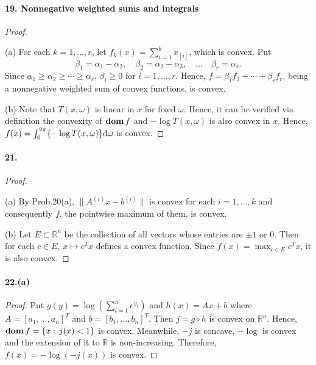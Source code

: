   \paragraph{19. Nonnegative weighted sums and integrals}
  \begin{proof}
    $\,$\par
    (a) For each $k=1,\dots,r$, let $f_k(x)=\sum_{i=1}^k x_[i]$, which is
    convex. Put
    \[
      \beta_1=\alpha_1-\alpha_2,\quad
      \beta_2=\alpha_2-\alpha_3,\quad
      \dots\quad
      \beta_r=\alpha_r.
    \]
    Since $\alpha_1\ge\alpha_2\ge\cdots\ge\alpha_r$, $\beta_i\ge 0$ for $i=1,
    \dots,r$. Hence, $f=\beta_1f_1+\cdots+\beta_rf_r$, being a nonnegative
    weighted sum of convex functions, is convex.\par
    (b) Note that $T(x,\omega)$ is linear in $x$ for fixed $\omega$. Hence, it 
    can be verified via definition the convexity of $\operatorname{\mathbf{dom}} f$ and $-\log T(x,
    \omega)$ is also convex in $x$. Hence, $f(x)=\int_{0}^{2\pi}\{-\log T(x,
    \omega)\}\mathrm{d}\omega$ is convex.
  \end{proof}
  
  \paragraph{21.}
  \begin{proof}
    $\,$\par
    (a) By Prob.20(a), $\|A^{(i)}x-b^{(i)}\|$ is convex for each $i=1,\dots,k$
    and consequently $f$, the pointwise maximum of them, is convex.\par
    (b) Let $E\subset\mathbb{R}^n$ be the collection of all vectors whose 
    entries are $\pm 1$ or $0$. Then for each $c\in E$, $x\mapsto c^Tx$ defines 
    a convex function. Since $f(x) = \max_{c\in E}c^Tx$, it is also convex.
  \end{proof}
  
  \paragraph{22.(a)}
  \begin{proof}
    Put $g(y)=\log(\sum_{i=1}^ne^{y_i})$ and $h(x)=Ax+b$ where $A=[a_1,\dots,
    a_n]^T$ and $b=[b_1,\dots,b_n]^T$. Then $j=g\circ h$ is convex on 
    $\mathbb{R}^n$. Hence, $\operatorname{\mathbf{dom}} f=\{x:\, j(x)<1\}$ is convex. Meanwhile, $-j$
    is concave, $-\log$ is convex and the extension of it to $\mathbb{R}$ is
    non-increasing. Therefore, $f(x)=-\log(-j(x))$ is convex.
  \end{proof}
